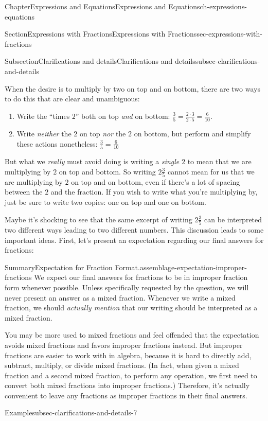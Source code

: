 \documentclass[twoside,11pt,]{book}
\numberwithin{equation}{chapter}
\begin{document}
\begin{chapterptx}{Chapter}{Expressions and Equations}{}{Expressions and Equations}{}{}{ch-expressions-equations}
\begin{sectionptx}{Section}{Expressions with Fractions}{}{Expressions with Fractions}{}{}{sec-expressions-with-fractions}
\begin{subsectionptx}{Subsection}{Clarifications and details}{}{Clarifications and details}{}{}{subsec-clarifications-and-details}
\begin{itemize}[label=\textbullet]
\par
When the desire is to multiply by two on top and on bottom, there are two ways to do this that are clear and unambiguous:%
\begin{enumerate}
\item{}Write the ``times \(2\)'' both on top \emph{and} on bottom: \(\frac35 = \frac{2 \cdot 3}{2 \cdot 5} = \frac{6}{10}\).%
\item{}Write \emph{neither} the \(2\) on top \emph{nor} the \(2\) on bottom, but perform and simplify these actions nonetheless: \(\frac35 = \frac{6}{10}\)%
\end{enumerate}
But what we \emph{really} must avoid doing is writing a \emph{single} \(2\) to mean that we are multiplying by \(2\) on top and bottom. So writing \(2 \frac{3}{5}\) cannot mean for us that we are multiplying by \(2\) on top and on bottom, even if there's a lot of spacing between the \(2\) and the fraction. If you wish to write what you're multiplying by, just be sure to write two copies: one on top and one on bottom.%
\end{itemize}
%
\par
Maybe it's shocking to see that the same excerpt of writing \(2 \frac35\) can be interpreted two different ways leading to two different numbers. This discussion leads to some important ideas. First, let's present an expectation regarding our final answers for fractions:%
\begin{assemblage}{Summary}{Expectation for Fraction Format.}{assemblage-expectation-improper-fractions}%
We expect our final answers for fractions to be in improper fraction form whenever possible. Unless specifically requested by the question, we will never present an answer as a mixed fraction. Whenever we write a mixed fraction, we should \emph{actually mention} that our writing should be interpreted as a mixed fraction.%
\end{assemblage}
You may be more used to mixed fractions and feel offended that the expectation avoids mixed fractions and favors improper fractions instead. But improper fractions are easier to work with in algebra, because it is hard to directly add, subtract, multiply, or divide mixed fractions. (In fact, when given a mixed fraction and a second mixed fraction, to perform any operation, we first need to convert both mixed fractions into improper fractions.) Therefore, it's actually convenient to leave any fractions as improper fractions in their final answers.%
\begin{example}{Example}{}{subsec-clarifications-and-details-7}%

\end{example}
\end{subsectionptx}
\end{sectionptx}
\end{chapterptx}
\end{document}
